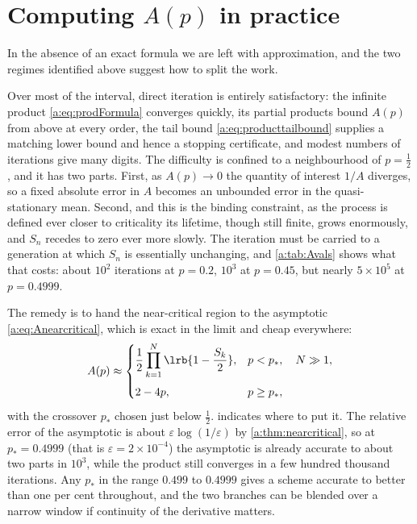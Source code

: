 \section{Computing \texorpdfstring{$A(p)$}{A(p)} in practice}
\label{a:sec:practical}

In the absence of an exact formula we are left with approximation, and the two
regimes identified above suggest how to split the work.

Over most of the interval, direct iteration is entirely satisfactory: the infinite
product \cref{a:eq:prodFormula} converges quickly, its partial products bound $A(p)$
from above at every order, the tail bound \cref{a:eq:producttailbound} supplies a
matching lower bound and hence a stopping certificate, and modest numbers of
iterations give many digits. The difficulty is confined to a neighbourhood of
$p=\tfrac12$, and it has two parts. First, as $A(p)\to0$ the quantity of interest
$1/A$ diverges, so a fixed absolute error in $A$ becomes an unbounded error in the
quasi-stationary mean. Second, and this is the binding constraint, as the process is
defined ever closer to criticality its lifetime, though still finite, grows
enormously, and $S_n$ recedes to zero ever more slowly. The iteration must be
carried to a generation at which $S_n$ is essentially unchanging, and
\cref{a:tab:Avals} shows what that costs: about $10^2$ iterations at $p=0.2$,
$10^3$ at $p=0.45$, but nearly $5\times10^5$ at $p=0.4999$.

The remedy is to hand the near-critical region to the asymptotic
\cref{a:eq:Anearcritical}, which is exact in the limit and cheap everywhere:
\begin{equation}
\label{a:eq:Apractical}
A(p) \approx
\begin{cases}
\displaystyle \frac12\prod_{k=1}^{N}\lrb{1-\frac{S_k}{2}}, & p<p_\ast,\quad N\gg1,\\[14pt]
2-4p, & p\ge p_\ast,
\end{cases}
\end{equation}
with the crossover $p_\ast$ chosen just below $\tfrac12$. 
indicates where to put it. The relative error of the asymptotic is about
$\varepsilon\log(1/\varepsilon)$ by \cref{a:thm:nearcritical}, so at
$p_\ast = 0.4999$ (that is $\varepsilon = 2\times10^{-4}$) the asymptotic is already
accurate to about two parts in $10^3$, while the product still converges in a few
hundred thousand iterations. Any $p_\ast$ in the range $0.499$ to $0.4999$ gives a
scheme accurate to better than one per cent throughout, and the two branches can be
blended over a narrow window if continuity of the derivative matters.

